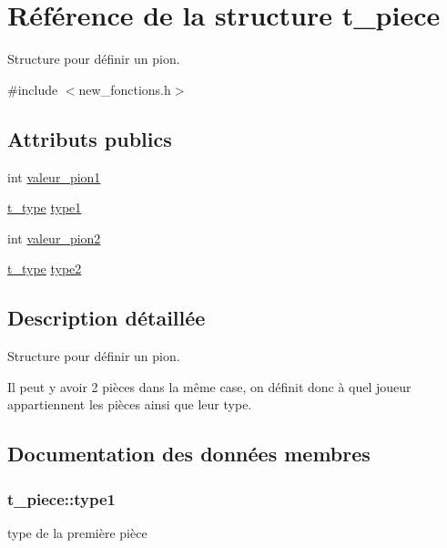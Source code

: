 \hypertarget{structt__piece}{}\section{Référence de la structure t\+\_\+piece}
\label{structt__piece}


Structure pour définir un pion.  




{\ttfamily \#include $<$new\+\_\+fonctions.\+h$>$}

\subsection*{Attributs publics}
\begin{DoxyCompactItemize}
\item 
int \hyperlink{structt__piece_a2854e60853e81ec5cb32a0b4d42a2c8f}{valeur\+\_\+pion1}
\item 
\hyperlink{new__fonctions_8h_a61532cc2157d912259fdd9aa25ca6d70}{t\+\_\+type} \hyperlink{structt__piece_aac3600897bf80126700557d4df1c572a}{type1}
\item 
int \hyperlink{structt__piece_a072647ef6ac729981f55d043655f928f}{valeur\+\_\+pion2}
\item 
\hyperlink{new__fonctions_8h_a61532cc2157d912259fdd9aa25ca6d70}{t\+\_\+type} \hyperlink{structt__piece_ad48b124427fe8c945cee48b15f2a270b}{type2}
\end{DoxyCompactItemize}


\subsection{Description détaillée}
Structure pour définir un pion. 

Il peut y avoir 2 pièces dans la même case, on définit donc à quel joueur appartiennent les pièces ainsi que leur type. 

\subsection{Documentation des données membres}
\subsubsection[{\texorpdfstring{type1}{type1}}]{ t\+\_\+piece\+::type1}\hypertarget{structt__piece_aac3600897bf80126700557d4df1c572a}{}\label{structt__piece_aac3600897bf80126700557d4df1c572a}
type de la première pièce 
